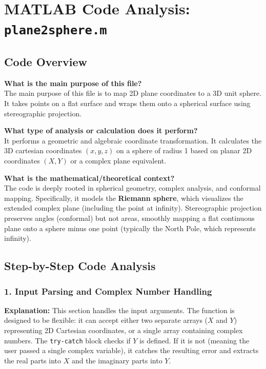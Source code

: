 
\chapter{MATLAB Code Analysis: \texttt{plane2sphere.m}}
\date{}


\maketitle

\section{Code Overview}

\textbf{What is the main purpose of this file?} \\
The main purpose of this file is to map 2D plane coordinates to a 3D unit sphere. It takes points on a flat surface and wraps them onto a spherical surface using stereographic projection. 

\textbf{What type of analysis or calculation does it perform?} \\
It performs a geometric and algebraic coordinate transformation. It calculates the 3D cartesian coordinates $(x,y,z)$ on a sphere of radius 1 based on planar 2D coordinates $(X,Y)$ or a complex plane equivalent.

\textbf{What is the mathematical/theoretical context?} \\
The code is deeply rooted in spherical geometry, complex analysis, and conformal mapping. Specifically, it models the \textbf{Riemann sphere}, which visualizes the extended complex plane (including the point at infinity). Stereographic projection preserves angles (conformal) but not areas, smoothly mapping a flat continuous plane onto a sphere minus one point (typically the North Pole, which represents infinity).

\section{Step-by-Step Code Analysis}

\subsection{1. Input Parsing and Complex Number Handling}
\textbf{Explanation:} 
This section handles the input arguments. The function is designed to be flexible: it can accept either two separate arrays ($X$ and $Y$) representing 2D Cartesian coordinates, or a single array containing complex numbers. The \texttt{try-catch} block checks if $Y$ is defined. If it is not (meaning the user passed a single complex variable), it catches the resulting error and extracts the real parts into $X$ and the imaginary parts into $Y$.

